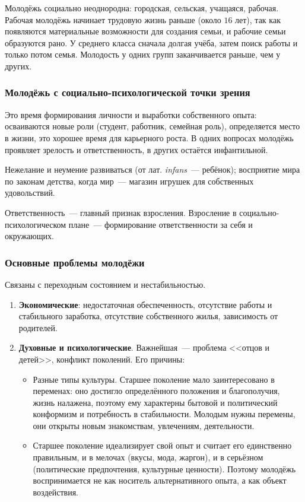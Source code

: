 \documentclass[12pt]{article}
\begin{document}
	Молодёжь социально неоднородна: городская, сельская, учащаяся, рабочая. Рабочая молодёжь начинает трудовую жизнь раньше (около $16$ лет), так как появляются материальные возможности для создания семьи, и рабочие семьи образуются рано. У среднего класса сначала долгая учёба, затем поиск работы и только потом семья. Молодость у одних групп заканчивается раньше, чем у других.

	\subsubsection{Молодёжь с социально-психологической точки зрения}

	Это время формирования личности и выработки собственного опыта: осваиваются новые роли (студент, работник, семейная роль), определяется место в жизни, это хорошее время для карьерного роста. В одних вопросах молодёжь проявляет зрелость и ответственность, в других остаётся инфантильной.

	\begin{definition}[Инфантилизм]
		Нежелание и неумение развиваться (от лат. \textit{infans}~--- ребёнок); восприятие мира по законам детства, когда мир~--- магазин игрушек для собственных удовольствий.
	\end{definition}

	\begin{note}
		Ответственность~--- главный признак взросления. Взросление в социально-психологическом плане~--- формирование ответственности за себя и окружающих.
	\end{note}

	\subsubsection{Основные проблемы молодёжи}

	Связаны с переходным состоянием и нестабильностью.

	\begin{enumerate}
		\item \textbf{Экономические}: недостаточная обеспеченность, отсутствие работы и стабильного заработка, отсутствие собственного жилья, зависимость от родителей.
		\item \textbf{Духовные и психологические}. Важнейшая~--- проблема <<отцов и детей>>, конфликт поколений. Его причины:
		\begin{itemize}
			\item Разные типы культуры. Старшее поколение мало заинтересовано в переменах: оно достигло определённого положения и благополучия, жизнь налажена, поэтому ему характерны бытовой и политический конформизм и потребность в стабильности. Молодым нужны перемены, они открыты новым знакомствам, увлечениям, деятельности.
			\item Старшее поколение идеализирует свой опыт и считает его единственно правильным, и в мелочах (вкусы, мода, жаргон), и в серьёзном (политические предпочтения, культурные ценности). Поэтому молодёжь воспринимается не как носитель альтернативного опыта, а как объект воздействия.
		\end{itemize}
	\end{enumerate}
\end{document}
